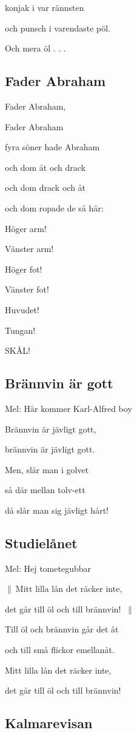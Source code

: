 konjak i var rännsten

och punsch i varendaste pöl.

Och mera öl . . . 

\subsection{\textbf{Fader Abraham 
}}

Fader Abraham,

Fader Abraham

fyra söner hade Abraham

och dom åt och drack

och dom drack och åt

och dom ropade de så här:\bigskip

Höger arm!

Vänster arm!

Höger fot!

Vänster fot!

Huvudet!

Tungan!

SKÅL! 

\subsection{\textbf{Brännvin är gott}}

Mel: Här kommer Karl-Alfred boy\bigskip

Brännvin är jävligt gott,

brännvin är jävligt gott.

Men, slår man i golvet

så där mellan tolv-ett

då slår man sig jävligt hårt!


\subsection{\textbf{Studielånet}}

Mel: Hej tometegubbar\bigskip

$\|\:$Mitt lilla lån det räcker inte,

det går till öl och till brännvin! $\:\|$

Till öl och brännvin går det åt

och till små flickor emellanåt.

Mitt lilla lån det räcker inte,

det går till öl och till brännvin!

\subsection{\textbf{Kalmarevisan}}

